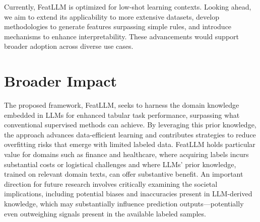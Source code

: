 Currently, \textsf{FeatLLM} is optimized for low-shot learning contexts. Looking ahead, we aim to extend its applicability to more extensive datasets, develop methodologies to generate features surpassing simple rules, and introduce mechanisms to enhance interpretability. These advancements would support broader adoption across diverse use cases.

\section{Broader Impact}
The proposed framework, \textsf{FeatLLM}, seeks to harness the domain knowledge embedded in LLMs for enhanced tabular task performance, surpassing what conventional supervised methods can achieve. By leveraging this prior knowledge, the approach advances data-efficient learning and contributes strategies to reduce overfitting risks that emerge with limited labeled data. \textsf{FeatLLM} holds particular value for domains such as finance and healthcare, where acquiring labels incurs substantial costs or logistical challenges and where LLMs’ prior knowledge, trained on relevant domain texts, can offer substantive benefit. An important direction for future research involves critically examining the societal implications, including potential biases and inaccuracies present in LLM-derived knowledge, which may substantially influence prediction outputs—potentially even outweighing signals present in the available labeled samples.

